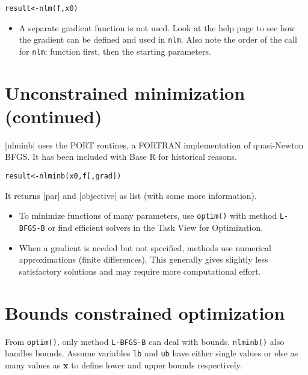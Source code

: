 \documentclass[11pt,a4paper,onecolumn,oneside]{extarticle}
\begin{document}
\begin{landscape}
\begin{multicols}{2}
\begin{alltt}
 result <- nlm(f, x0)
\end{alltt}

\begin{itemize}
\setlength\itemsep{0.1em}
 \item
A separate gradient function is not used. Look at the help page to see how the
gradient can be defined and used in \verb|nlm|. Also note the order of
the call for \texttt{nlm}: function first, then the starting parameters.
\end{itemize}

\section*{\color{darkred} Unconstrained minimization (continued)}

|nlminb| uses the PORT routines, a FORTRAN implementation of quasi-Newton BFGS.
It has been included with Base R for historical reasons.

\begin{alltt}
 result <- nlminb(x0, f [, grad])
\end{alltt}

It returns |par| and |objective| as list (with some more information).

\begin{itemize}
\setlength\itemsep{0.1em}
\item
  To minimize functions of many parameters, use \texttt{optim()} with method 
  \texttt{L-BFGS-B} or find efficient solvers in the Task View for Optimization.
\item
  When a gradient is needed but not specified, methods use numerical
  approximations (finite differences). This generally gives slightly less
  satisfactory solutions and may require more computational effort.
\end{itemize}



\section*{\color{darkred} Bounds constrained optimization}

From \texttt{optim()}, only method \texttt{L-BFGS-B} can deal with
bounds. \texttt{nlminb()} also handles bounds. Assume variables
\texttt{lb} and \texttt{ub} have either single values or else as many 
values as \textbf{x} to define lower and upper bounds respectively.


\end{multicols}
\end{landscape}
\end{document}
